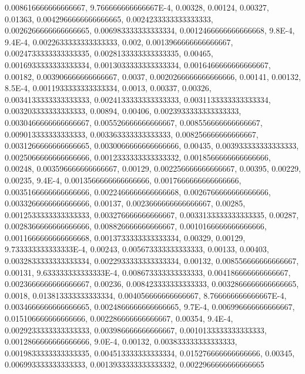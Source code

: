 0.008616666666666667, 9.766666666666667E-4, 0.00328, 0.00124, 0.00327, 0.01363, 0.0042966666666666665, 0.0024233333333333333, 0.0026266666666666665, 0.006983333333333334, 0.0012466666666666668, 9.8E-4, 9.4E-4, 0.0022633333333333333, 0.002, 0.0013966666666666667, 0.0024733333333333335, 0.0028133333333333335, 0.00465, 0.0016933333333333334, 0.0013033333333333334, 0.0016466666666666667, 0.00182, 0.003906666666666667, 0.0037, 0.0020266666666666666, 0.00141, 0.00132, 8.5E-4, 0.0011933333333333334, 0.0013, 0.00337, 0.00326, 0.0034133333333333333, 0.0024133333333333333, 0.0031133333333333334, 0.003203333333333333, 0.00894, 0.00406, 0.0023933333333333333, 0.0030466666666666667, 0.005526666666666667, 0.008556666666666667, 0.009013333333333333, 0.003363333333333333, 0.008256666666666667, 0.0031266666666666665, 0.0030066666666666666, 0.00435, 0.003933333333333333, 0.0025066666666666666, 0.0012333333333333332, 0.0018566666666666666, 0.00248, 0.003596666666666667, 0.00129, 0.002256666666666667, 0.00395, 0.00229, 0.00235, 9.4E-4, 0.0013566666666666666, 0.0017666666666666666, 0.0035166666666666666, 0.0022466666666666668, 0.0026766666666666666, 0.0033266666666666666, 0.00137, 0.0023666666666666667, 0.00285, 0.0012533333333333333, 0.003276666666666667, 0.0033133333333333335, 0.00287, 0.0028366666666666666, 0.008826666666666667, 0.0010166666666666666, 0.0011666666666666668, 0.0013733333333333334, 0.00329, 0.00129, 9.733333333333333E-4, 0.00243, 0.005673333333333333, 0.00133, 0.00403, 0.0032833333333333334, 0.0022933333333333334, 0.00132, 0.008556666666666667, 0.00131, 9.633333333333333E-4, 0.008673333333333333, 0.004186666666666667, 0.0023666666666666667, 0.00236, 0.008423333333333333, 0.0032866666666666665, 0.0018, 0.013813333333333334, 0.004056666666666667, 8.766666666666667E-4, 0.0034666666666666665, 0.0024866666666666665, 9.7E-4, 0.006996666666666667, 0.015106666666666666, 0.002286666666666667, 0.00354, 9.4E-4, 0.0029233333333333333, 0.003986666666666667, 0.0010133333333333333, 0.0012866666666666666, 9.0E-4, 0.00132, 0.003833333333333333, 0.0019833333333333335, 0.004513333333333334, 0.015276666666666666, 0.00345, 0.006993333333333333, 0.0013933333333333332, 0.0022966666666666665